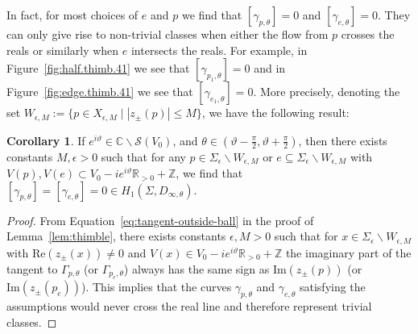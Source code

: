 \documentclass[12pt,reqno]{amsart}
\theoremstyle{definition}
\newtheorem{corollary}[theorem]{Corollary}
\def\BZ{\mathbb Z}
\def\BR{\mathbb R}
\def\BC{\mathbb C}
\def\Re{\mathrm{Re}}
\def\Im{\mathrm{Im}}
\renewcommand{\=}{\;=\;}
\begin{document}
In fact, for most choices of $e$ and $p$ we find that $[\gamma_{p,\theta}]=0$ and $[\gamma_{e,\theta}]=0$. They can only give rise to non-trivial classes when either the flow from $p$ crosses the reals or similarly when $e$ intersects the reals. For example, in Figure~\ref{fig:half.thimb.41} we see that $[\gamma_{p_1,\theta}]=0$ and in Figure~\ref{fig:edge.thimb.41} we see that $[\gamma_{e_1,\theta}]=0$. More precisely, denoting the set $W_{\epsilon,M}:=\{p\in X_{\epsilon,M}\;\vert\; |z_\pm(p)|\leq M\}$, we have the following result:
\begin{corollary}\label{cor:half.thimb.stateint.zero}
If $e^{i\vartheta}\in\BC\backslash\mathcal{S}(V_{0})$, and $\theta\in(\vartheta-\tfrac{\pi}{2},\vartheta+\tfrac{\pi}{2})$, then there exists constants $M,\epsilon>0$ such that for any $p\in\Sigma_{\epsilon}\backslash W_{\epsilon,M}$ or $e\subseteq\Sigma_{\epsilon}\backslash W_{\epsilon,M}$ with $V(p),V(e)\subset V_0-i e^{i\vartheta}\BR_{>0}+\BZ$, we find that $[\gamma_{p,\theta}]=[\gamma_{e,\theta}]=0\in H_1(\Sigma,D_{\infty,\theta})$.
\end{corollary}
\begin{proof}
From Equation~\eqref{eq:tangent-outside-ball} in the proof of Lemma~\ref{lem:thimble}, there exists constants $\epsilon, M>0$ such that for $x\in\Sigma_{\epsilon}\backslash W_{\epsilon,M}$ with $\Re(z_\pm(x))\neq0$ and $V(x)\in V_0-i e^{i\vartheta}\BR_{>0}+\BZ$ the imaginary part of the tangent to $\Gamma_{p,\theta}$ (or $\Gamma_{p_e,\theta}$) always has the same sign as $\Im(z_\pm(p))$ (or $\Im(z_\pm(p_e))$). This implies that the curves $\gamma_{p,\theta}$ and $\gamma_{e,\theta}$ satisfying the assumptions would never cross the real line and therefore represent trivial classes.
\end{proof}
\end{document}
